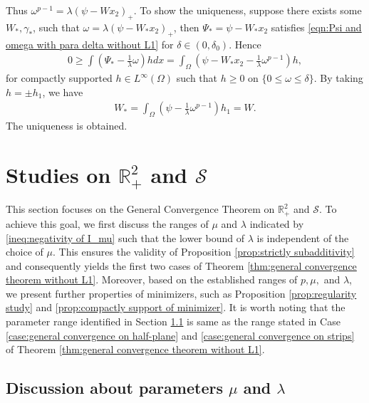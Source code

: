 \documentclass[11pt,letterpaper]{amsart}
\theoremstyle{definition}
\theoremstyle{remark}
\renewcommand{\S}{\mathcal{S}}
\newcommand{\R}{\mathbb{R}}
\numberwithin{equation}{section}
\begin{document}
Thus $\omega^{p-1} = \lambda(\psi -W x_{2})_+$. To show the uniqueness, suppose there exists some $W_*,\gamma_*$, such that $\omega = \lambda(\psi - W_* x_{2})_+$, then $\Psi_*=\psi- W_* x_{2}$ satisfies \eqref{eqn:Psi and omega with para delta without L1} for $\delta\in (0,\delta_0).$ Hence 
\begin{align*}
    0\geq \int(\Psi_*-\frac{1}{\lambda}\omega) h dx = \int_{\Omega}\left(\psi-W_* x_2-\frac{1}{\lambda}\omega^{p-1}\right)h,
\end{align*}
for compactly supported $h \in L^{\infty}(\Omega)$ such that $h \geq 0$ on $\{0 \leq \omega \leq \delta \}$. By taking $h=\pm h_1$, we have 
\begin{align*}
    W_*=\int_{\Omega}\left(\psi-\frac{1}{\lambda}\omega^{p-1}\right)h_1=W.
\end{align*}
The uniqueness is obtained. 

\rightline{$\Box$}

\section{Studies on $\mathbb{R}^2_+$ and $\S$} \label{sec:study of half plane and strip}

This section focuses on the General Convergence Theorem on $\R^2_+$ and $\S$. To achieve this goal, we first discuss the ranges of $\mu$ and $\lambda$ indicated by \eqref{ineq:negativity of I_mu} such that the lower bound of $\lambda$ is independent of the choice of $\mu$. This ensures the validity of Proposition \ref{prop:strictly subadditivity} and consequently yields the first two cases of Theorem \ref{thm:general convergence theorem without L1}. Moreover, based on the established ranges of $p,\mu,$ and $\lambda$, we present further properties of minimizers, such as Proposition \ref{prop:regularity study} and \ref{prop:compactly support of minimizer}. It is worth noting that the parameter range identified in Section \ref{sec:parameter analysis on half plane and strip} is same as the range stated in Case \ref{case:general convergence on half-plane} and \ref{case:general convergence on strips} of Theorem \ref{thm:general convergence theorem without L1}.

\subsection{Discussion about parameters $\mu$ and $\lambda$} \label{sec:parameter analysis on half plane and strip}
\end{document}
